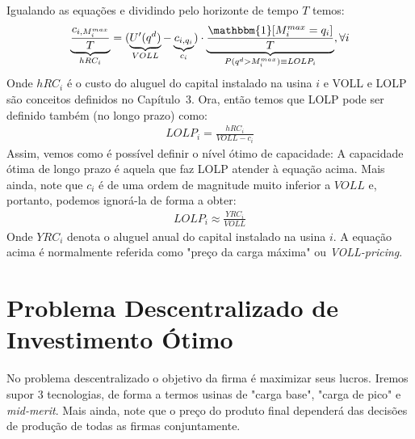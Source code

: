 Igualando as equações e dividindo pelo horizonte de tempo $T$ temos:
\begin{align*}
    \underbrace{\frac{c_{i,M_i^{max}}}{T}}_{hRC_i} = (\underbrace{U'(q^d)}_{VOLL}-\underbrace{c_{i,q_i}}_{c_i})\cdot\underbrace{\frac{\mathbbm{1}[M_i^{max}=q_i]}{T}}_{P(q^d>M_i^{max})\equiv LOLP_i},\forall i
\end{align*}
Onde $hRC_i$ é o custo do aluguel do capital instalado na usina $i$ e VOLL e LOLP são conceitos definidos no Capítulo~3. Ora, então temos que LOLP pode ser definido também (no longo prazo) como:
\begin{align*}
    LOLP_i = \frac{hRC_i}{VOLL-c_i}
\end{align*}
Assim, vemos como é possível definir o nível ótimo de capacidade: A capacidade ótima de longo prazo é aquela que faz LOLP atender à equação acima. Mais ainda, note que $c_i$ é de uma ordem de magnitude muito inferior a $VOLL$ e, portanto, podemos ignorá-la de forma a obter:
\begin{align*}
    LOLP_i\approx \frac{YRC_i}{VOLL}
\end{align*}
Onde $YRC_i$ denota o aluguel anual do capital instalado na usina $i$. A equação acima é normalmente referida como "preço da carga máxima" ou \textit{VOLL-pricing}.

\section{Problema Descentralizado de Investimento Ótimo}
No problema descentralizado o objetivo da firma é maximizar seus lucros. Iremos supor 3 tecnologias, de forma a termos usinas de "carga base", "carga de pico" e \textit{mid-merit}. Mais ainda, note que o preço do produto final dependerá das decisões de produção de todas as firmas conjuntamente.

